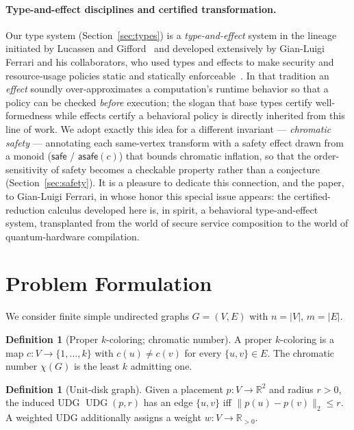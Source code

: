 \documentclass[11pt]{article}
\theoremstyle{definition}
\newtheorem{definition}[theorem]{Definition}
\theoremstyle{remark}
\newcommand{\UDG}{\operatorname{UDG}}
\newcommand{\R}{\mathbb{R}}
\newcommand{\safe}{\textsf{safe}}
\newcommand{\asafe}[1]{\textsf{asafe}(#1)}
\begin{document}
\paragraph{Type-and-effect disciplines and certified transformation.} Our type system
(Section~\ref{sec:types}) is a \emph{type-and-effect} system in the lineage initiated
by Lucassen and Gifford~\cite{LucassenGifford1988} and developed extensively by
Gian-Luigi Ferrari and his collaborators, who used types and effects to make security
and resource-usage policies static and statically
enforceable~\cite{BartolettiDeganoFerrariZunino2009,DeganoFerrariGalletta2016,BodeiDeganoFerrari1998}.
In that tradition an \emph{effect} soundly over-approximates a computation's runtime
behavior so that a policy can be checked \emph{before} execution; the slogan that base
types certify well-formedness while effects certify a behavioral policy is directly
inherited from this line of work. We adopt exactly this idea for a different invariant
--- \emph{chromatic safety} --- annotating each same-vertex transform with a safety
effect drawn from a monoid ($\safe$ / $\asafe{c}$) that bounds chromatic inflation, so
that the order-sensitivity of safety becomes a checkable property rather than a
conjecture (Section~\ref{sec:safety}). It is a pleasure to dedicate this connection,
and the paper, to Gian-Luigi Ferrari, in whose honor this special issue appears: the
certified-reduction calculus developed here is, in spirit, a behavioral
type-and-effect system, transplanted from the world of secure service composition to
the world of quantum-hardware compilation.

\section{Problem Formulation}
\label{sec:problem}

We consider finite simple undirected graphs $G=(V,E)$ with $n=|V|$, $m=|E|$.

\begin{definition}[Proper $k$-coloring; chromatic number]
A proper $k$-coloring is a map $c:V\to\{1,\dots,k\}$ with $c(u)\ne c(v)$ for every
$\{u,v\}\in E$. The chromatic number $\chi(G)$ is the least $k$ admitting one.
\end{definition}

\begin{definition}[Unit-disk graph]
Given a placement $p:V\to\R^2$ and radius $r>0$, the induced UDG $\UDG(p,r)$ has an
edge $\{u,v\}$ iff $\|p(u)-p(v)\|_2\le r$. A weighted UDG additionally assigns a
weight $w:V\to\R_{>0}$.
\end{definition}
\end{document}
